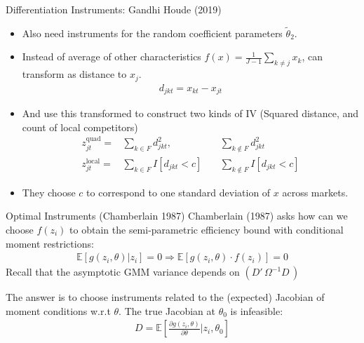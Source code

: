 \documentclass[aspectratio=169,11pt]{beamer}
\begin{document}
\begin{frame}{Differentiation Instruments: Gandhi Houde (2019)}
\small
\begin{itemize}
\item Also need instruments for the random coefficient parameters $\widetilde{\theta}_2$.
\item Instead of average of other characteristics $f(x) = \frac{1}{J-1} \sum_{k \neq j} x_k$, can transform as distance to $x_j$.
\begin{eqnarray*}
d_{jkt} =  x_{kt} - x_{jt}  
\end{eqnarray*}
\item And use this transformed to construct two kinds of IV (Squared distance, and count of local competitors)
\begin{eqnarray*}
z_{jt}^{\text{quad}} =& \sum_{k  \in F}  d_{jkt}^2,  \quad &\sum_{k \notin F}  d_{jkt}^2 \\
z_{jt}^{\text{local}} =& \sum_{k \in F}  I[d_{jkt} < c]   \quad &\sum_{k \notin F}   I[d_{jkt} < c]
\end{eqnarray*}
\item They choose $c$ to correspond to one standard deviation of $x$ across markets.
\end{itemize}
\end{frame}




\begin{frame}{Optimal Instruments (Chamberlain 1987)}
Chamberlain (1987) asks how can we choose $f(z_i)$ to obtain the semi-parametric efficiency bound with conditional moment restrictions:
\begin{align*}
\mathbb{E}[g(z_i,\theta) | z_i]=0 \Rightarrow \mathbb{E}[g(z_i,\theta) \cdot f(z_i) ]=0 
\end{align*}
Recall that the asymptotic GMM variance depends on $(D'\, \Omega^{-1} D\,)$

The answer is to choose instruments related to the (expected) Jacobian of moment conditions w.r.t $\theta$. The true Jacobian at $\theta_0$ is \alert{infeasible}:
\begin{align*}
D=\mathbb{E}\left[\frac{\partial g(z_i,\theta)}{\partial \theta} | z_i, \theta_0 \right]
\end{align*}
\end{frame}
\end{document}
